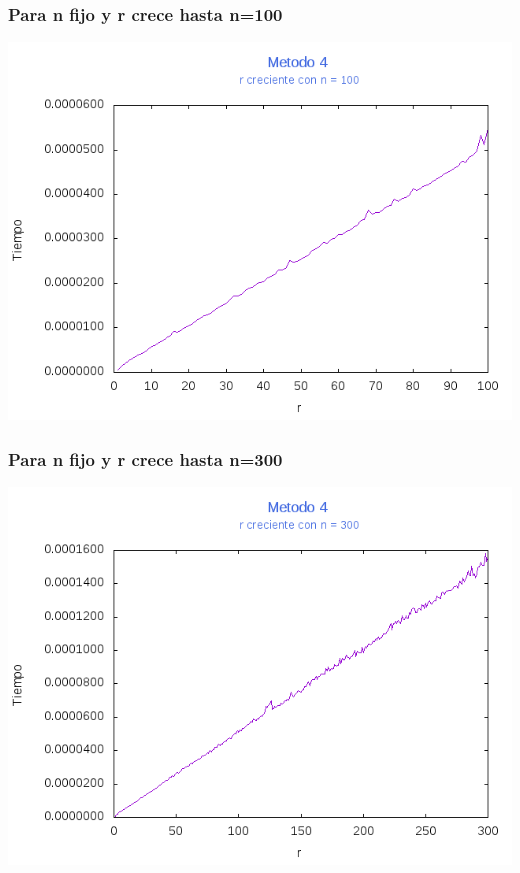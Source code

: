 \documentclass[12pt,letterpaper]{scrartcl}
\begin{document}
\subsubsection{Para n fijo y r crece hasta n=100}
\includegraphics[scale=1]{Metodo4/plot100m4}

\subsubsection{Para n fijo y r crece hasta n=300}
\includegraphics[scale=1]{Metodo4/plot300m4}
\end{document}
